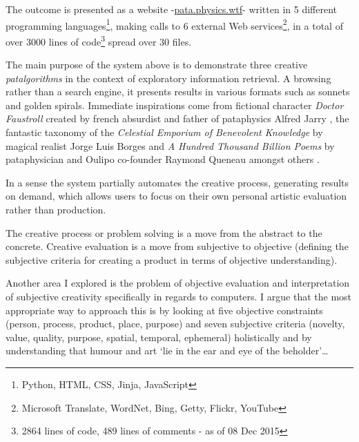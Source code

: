 The outcome is presented as a website -\url{pata.physics.wtf}- written in 5 different programming languages\footnote{Python, HTML, CSS, Jinja, JavaScript}, making calls to 6 external Web services\footnote{Microsoft Translate, WordNet, Bing, Getty, Flickr, YouTube}, in a total of over 3000 lines of code\footnote{2864 lines of code, 489 lines of comments - as of 08 Dec 2015} spread over 30 files.

The main purpose of the system above is to demonstrate three creative \emph{patalgorithms} in the context of exploratory information retrieval. A browsing rather than a search engine, it presents results in various formats such as sonnets and golden spirals. Immediate inspirations come from fictional character \emph{Doctor Faustroll} created by french absurdist and father of pataphysics Alfred Jarry \citeyear{Jarry1996}, the fantastic taxonomy of the \emph{Celestial Emporium of Benevolent Knowledge} by magical realist Jorge Luis Borges \citeyear{Borges2000} and \emph{A Hundred Thousand Billion Poems} by pataphysician and Oulipo co-founder Raymond Queneau amongst others \citeyear{Queneau1961}.

In a sense the system partially automates the creative process, generating results on demand, which allows users to focus on their own personal artistic evaluation rather than production.


\begin{draft}
  The creative process or problem solving is a move from the abstract to the concrete. Creative evaluation is a move from subjective to objective (defining the subjective criteria for creating a product in terms of objective understanding).
\end{draft}

Another area I explored is the problem of objective evaluation and interpretation of subjective creativity specifically in regards to computers. I argue that the most appropriate way to approach this is by looking at five objective constraints (person, process, product, place, purpose) and seven subjective criteria (novelty, value, quality, purpose, spatial, temporal, ephemeral) holistically and by understanding that humour and art `lie in the ear and eye of the beholder'\ldots

